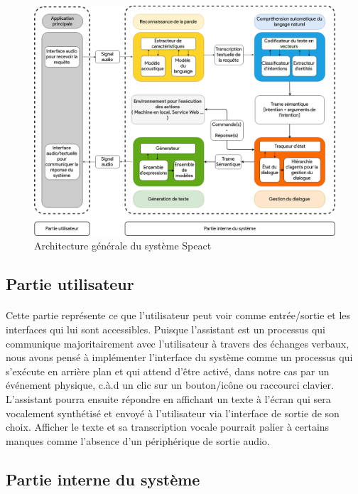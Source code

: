 \begin{figure}[h]
	\centering
	\includegraphics[width=\linewidth]{images/SPA_architecture.png}
	\caption{Architecture générale du système Speact}
	\label{spaArch}
\end{figure}


	\subsection{Partie utilisateur}
	\paragraph{}
	Cette partie représente ce que l'utilisateur peut voir comme entrée/sortie et les interfaces qui lui sont accessibles. Puisque l'assistant est un processus qui communique majoritairement avec l'utilisateur à travers des échanges verbaux, nous avons pensé à implémenter l'interface du système comme un processus qui s'exécute en arrière plan et qui attend d'être activé, dans notre cas par un événement physique, c.à.d un clic sur un bouton/icône ou raccourci clavier. L'assistant pourra ensuite répondre en affichant un texte à l'écran qui sera vocalement synthétisé et envoyé à l'utilisateur via l'interface de sortie de son choix. Afficher le texte et sa transcription vocale pourrait palier à certains manques comme l'absence d'un périphérique de sortie audio.
	\subsection{Partie interne du système}
	
